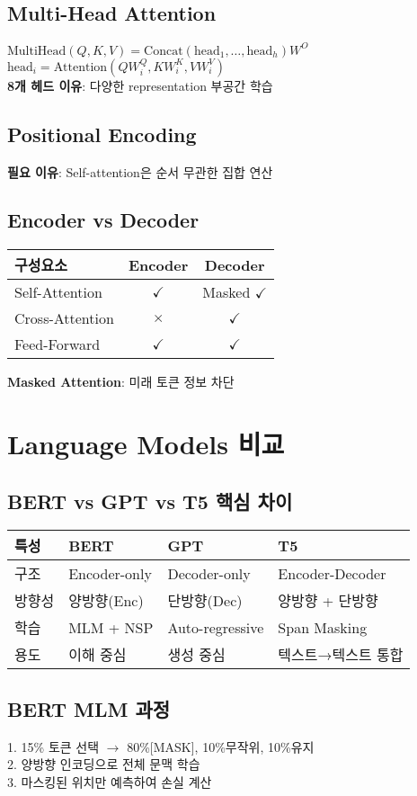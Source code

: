 \documentclass[6pt,landscape,a4paper]{article}
\begin{document}
\begin{multicols}{3}
\subsection{Multi-Head Attention}
$\text{MultiHead}(Q,K,V) = \text{Concat}(\text{head}_1, \ldots, \text{head}_h)W^O$\\
$\text{head}_i = \text{Attention}(QW_i^Q, KW_i^K, VW_i^V)$\\
\textbf{8개 헤드 이유}: 다양한 representation 부공간 학습
\subsection{Positional Encoding}
\textbf{필요 이유}: Self-attention은 순서 무관한 집합 연산
\subsection{Encoder vs Decoder}
\begin{tabular}{|l|c|c|}
\hline
구성요소 & Encoder & Decoder \\
\hline
Self-Attention & $\checkmark$ & Masked $\checkmark$ \\
Cross-Attention & $\times$ & $\checkmark$ \\
Feed-Forward & $\checkmark$ & $\checkmark$ \\
\hline
\end{tabular}

\textbf{Masked Attention}: 미래 토큰 정보 차단
\section{Language Models 비교}
\subsection{BERT vs GPT vs T5 핵심 차이}
\begin{tabular}{|l|l|l|l|}
\hline
특성 & BERT & GPT & T5 \\
\hline
구조 & Encoder-only & Decoder-only & Encoder-Decoder \\
방향성 & 양방향(Enc) & 단방향(Dec) & 양방향 + 단방향 \\
학습 & MLM + NSP & Auto-regressive & Span Masking \\
용도 & 이해 중심 & 생성 중심 & 텍스트→텍스트 통합 \\
\hline
\end{tabular}
\subsection{BERT MLM 과정}
1. 15\% 토큰 선택 $\rightarrow$ 80\%[MASK], 10\%무작위, 10\%유지\\
2. 양방향 인코딩으로 전체 문맥 학습\\
3. 마스킹된 위치만 예측하여 손실 계산

\end{multicols}
\end{document}
